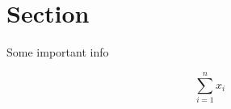 \documentclass{article}
\begin{document}
\section{Section}

Some important info

\begin{equation}
\sum_{i = 1}^{n} x_i
\end{equation}
\end{document}
